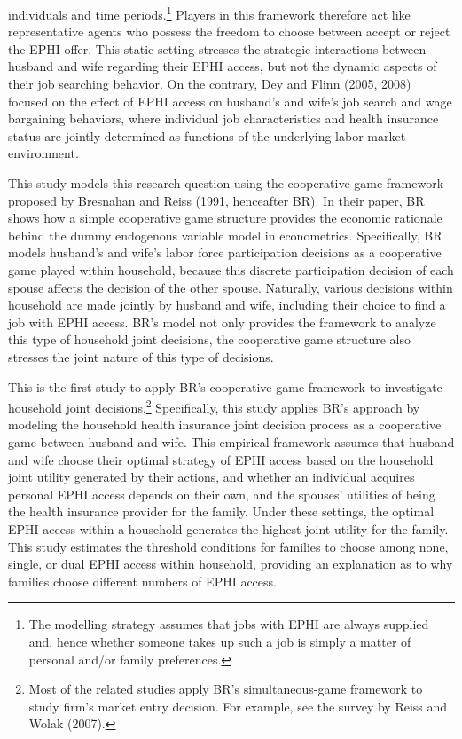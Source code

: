 \documentclass[legno,11pt]{article}
\begin{document}
individuals and time periods.\footnote{The modelling strategy
assumes that jobs with EPHI are always supplied and, hence whether
someone takes up such a job is simply a matter of personal and/or
family preferences.} Players in this framework therefore act like
representative agents who possess the freedom to choose between
accept or reject the EPHI offer. This static setting stresses the
strategic interactions between husband and wife regarding their EPHI
access, but not the dynamic aspects of their job searching behavior.
On the contrary, Dey and Flinn (2005, 2008) focused on the effect of
EPHI access on husband's and wife's job search and wage bargaining
behaviors, where individual job characteristics and health insurance
status are jointly determined as functions of the underlying labor
market environment.
\par
This study models this research question using the cooperative-game framework proposed by Bresnahan and Reiss (1991, henceafter BR). In their paper, BR shows how a simple cooperative game structure provides the economic rationale behind the dummy endogenous variable model in econometrics. Specifically, BR models husband's and wife's labor force participation decisions as a cooperative game played within household, because this discrete participation decision of each spouse affects the decision of the other spouse. Naturally, various decisions within household are made jointly by husband and wife, including their choice to find a job with EPHI access. BR's model not only provides the framework to analyze this type of household joint decisions, the cooperative game structure also stresses the joint nature of this type of decisions.
\par

This is the first study to apply BR's cooperative-game framework to
investigate household joint decisions.\footnote{Most of the related studies apply BR's
simultaneous-game framework to study firm's market entry decision. For example, see the survey by Reiss and Wolak (2007).} Specifically, this study applies BR's approach by
modeling the household health insurance joint decision process as a cooperative game between husband and wife. This
empirical
 framework assumes that husband and wife choose their
 optimal strategy of EPHI access based on the
 household joint utility generated by their actions,
 and whether an individual acquires personal EPHI access
  depends on their own, and the spouses' utilities of
  being the health insurance provider for the family. Under
  these settings, the optimal EPHI access within a
  household generates the highest joint utility for the family.
  This study estimates the
  threshold conditions for families to choose among none,
  single, or dual EPHI access within household, providing an explanation
  as to why families choose different
  numbers of EPHI access.
\par
\end{document}
